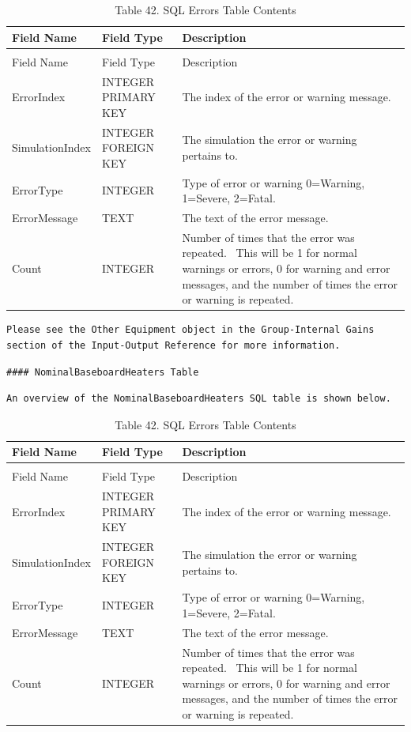 \begin{longtable}[c]{p{1.5in}p{1.5in}p{2.99in}}
\caption{Table 42. SQL Errors Table Contents \label{table:table-42.-sql-errors-table-contents}} \tabularnewline
\toprule 
Field Name & Field Type & Description \tabularnewline
\midrule
\endfirsthead

\caption[]{Table 42. SQL Errors Table Contents} \tabularnewline
\toprule 
Field Name & Field Type & Description \tabularnewline
\midrule
\endhead

ErrorIndex & INTEGER PRIMARY KEY & The index of the error or warning message. \tabularnewline
SimulationIndex & INTEGER FOREIGN KEY & The simulation the error or warning pertains to. \tabularnewline
ErrorType & INTEGER & Type of error or warning 0=Warning, 1=Severe, 2=Fatal. \tabularnewline
ErrorMessage & TEXT & The text of the error message. \tabularnewline
Count & INTEGER & Number of times that the error was repeated.~ This will be 1 for normal warnings or errors, 0 for warning and error messages, and the number of times the error or warning is repeated. \tabularnewline
\bottomrule
\end{longtable}

\begin{lstlisting}
Please see the Other Equipment object in the Group-Internal Gains section of the Input-Output Reference for more information.
\end{lstlisting}

\begin{lstlisting}
#### NominalBaseboardHeaters Table
\end{lstlisting}

\begin{lstlisting}
An overview of the NominalBaseboardHeaters SQL table is shown below.
\end{lstlisting}

\begin{longtable}[c]{p{1.5in}p{1.5in}p{2.99in}}
\caption{Table 42. SQL Errors Table Contents \label{table:table-42.-sql-errors-table-contents}} \tabularnewline
\toprule 
Field Name & Field Type & Description \tabularnewline
\midrule
\endfirsthead

\caption[]{Table 42. SQL Errors Table Contents} \tabularnewline
\toprule 
Field Name & Field Type & Description \tabularnewline
\midrule
\endhead

ErrorIndex & INTEGER PRIMARY KEY & The index of the error or warning message. \tabularnewline
SimulationIndex & INTEGER FOREIGN KEY & The simulation the error or warning pertains to. \tabularnewline
ErrorType & INTEGER & Type of error or warning 0=Warning, 1=Severe, 2=Fatal. \tabularnewline
ErrorMessage & TEXT & The text of the error message. \tabularnewline
Count & INTEGER & Number of times that the error was repeated.~ This will be 1 for normal warnings or errors, 0 for warning and error messages, and the number of times the error or warning is repeated. \tabularnewline
\bottomrule
\end{longtable}

